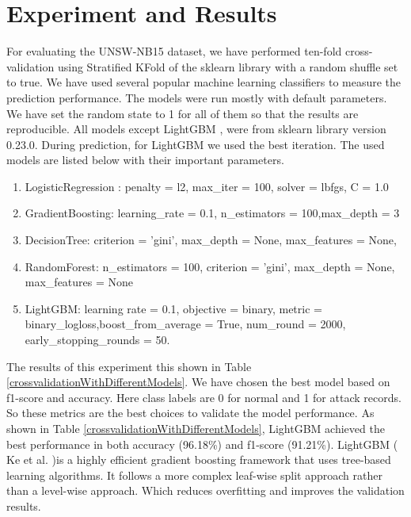\documentclass[14pt, conference]{IEEEtran}
\begin{document}
\section{Experiment and Results \label{results}}
For evaluating the UNSW-NB15 dataset, we have performed ten-fold cross-validation using Stratified KFold of the sklearn library with a random shuffle set to true. We have used several popular machine learning classifiers to measure the prediction performance. The models were run mostly with default parameters. We have set the random state to 1 for all of them so that the results are reproducible. All models except LightGBM \cite{ke2017lightgbm}, were from sklearn library version 0.23.0. During prediction, for LightGBM we used the best iteration. The used models are listed below with their important parameters.
\begin{enumerate}
    \item LogisticRegression : penalty = l2, max\_iter = 100, solver = lbfgs, C = 1.0
    \item GradientBoosting: learning\_rate = 0.1, n\_estimators = 100,max\_depth = 3
    \item DecisionTree: criterion = 'gini', max\_depth = None, max\_features = None,
    \item RandomForest: n\_estimators = 100, criterion = 'gini', max\_depth = None, max\_features = None
    \item LightGBM: learning rate = 0.1, objective = binary, metric = binary\_logloss,boost\_from\_average = True,
    num\_round = 2000, early\_stopping\_rounds = 50.
\end{enumerate}

The results of this experiment this shown in Table \ref{crossvalidationWithDifferentModels}. We have chosen the best model based on f1-score and accuracy. Here class labels are 0 for normal and 1 for attack records. So these metrics are the best choices to validate the model performance. As shown in Table \ref{crossvalidationWithDifferentModels}, LightGBM achieved the best performance in both accuracy (96.18\%) and f1-score (91.21\%). LightGBM ( Ke et al. \cite{ke2017lightgbm})is a highly efficient gradient boosting framework that uses tree-based learning algorithms. It follows a more complex leaf-wise split approach rather than a level-wise approach. Which reduces overfitting and improves the validation results. 
\end{document}
